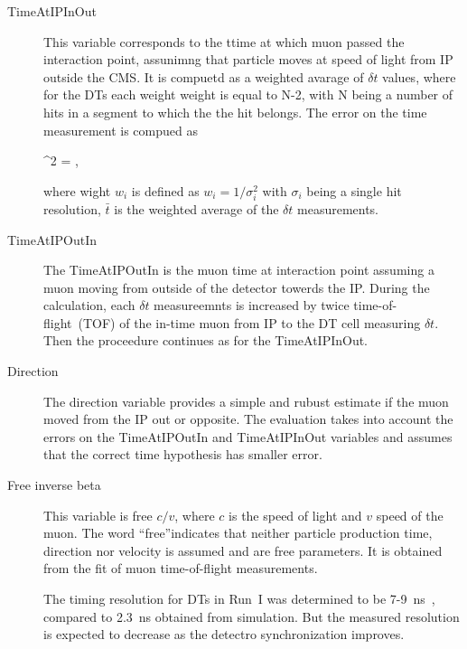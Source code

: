 \begin{description}
\item [TimeAtIPInOut]
This variable corresponds to the ttime at which muon passed the interaction point, assunimng that particle moves at speed of light from IP outside the CMS. It is compuetd as a weighted avarage of $\delta t$ values, where for the DTs each weight weight is equal to N-2, with N being a number of hits in a segment to which the the hit belongs. The error on the time measurement is compued as

{
 \sigma^{2} =  \times {} \times {},
}

where wight $w_{i}$ is defined as $w_i = 1/\sigma_{i}^2$ with $\sigma_{i}$ being a single hit resolution, $\bar{t}$ is the weighted average of the $\delta t$ measurements.

\item[TimeAtIPOutIn]
The TimeAtIPOutIn is the muon time at interaction point assuming a muon moving from outside of the detector towerds the IP. During the calculation, each $\delta t$ measureemnts is increased by twice time-of-flight~(TOF) of the in-time muon from IP to the DT cell measuring $\delta t$. Then the proceedure continues as for the TimeAtIPInOut.

\item[Direction]
The direction variable provides a simple and rubust estimate if the muon moved from the IP out or opposite. The evaluation takes into account the errors on the TimeAtIPOutIn and TimeAtIPInOut variables and assumes that the correct time hypothesis has smaller error.

\item[Free inverse beta]
This variable is free $c/v$, where $c$ is the speed of light and $v$ speed of the muon. The word ``free''indicates that neither particle production time, direction nor velocity is assumed and are free parameters. It is obtained from the fit of muon time-of-flight measurements.

The timing resolution for DTs in Run~I was determined to be 7-9~ns~\cite{Traczyk:1365029}, compared to 2.3~ns obtained from simulation. But the measured resolution is expected to decrease as the detectro synchronization improves.

\end{description}


